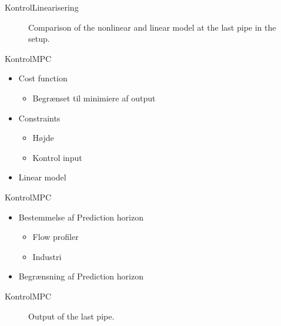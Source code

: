\begin{frame}{Kontrol}{Linearisering}
    
\begin{figure}[H]
\centering

\caption{Comparison of the nonlinear and linear model at the last pipe in the setup.}
\label{fig:linear_nonlinear_comparison_last_pipe}
\end{figure}

\end{frame}

\begin{frame}{Kontrol}{MPC}
    \vfill\vfill\centering
\begin{itemize}
	\item Cost function
	\begin{itemize}
		\item Begrænset til minimiere af output
	\end{itemize}
	\item Constraints
	\begin{itemize}
		\item Højde
		\item Kontrol input
	\end{itemize}
	\item Linear model
\end{itemize}
\vfill\vfill
\end{frame}





\begin{frame}{Kontrol}{MPC}
  \vfill\vfill\centering
    \begin{itemize}
    	\item Bestemmelse af Prediction horizon
    	\begin{itemize}
    		\item Flow profiler
    		\item Industri 
    	\end{itemize}
    	\item Begrænsning af Prediction horizon
    \end{itemize}

\vfill\vfill
\end{frame}

\begin{frame}{Kontrol}{MPC}
 \begin{figure}[H]
 \centering
 
\caption{Output of the last pipe.}
\label{fig:MPC_test_output_first_test}
\end{figure}   


\end{frame}

